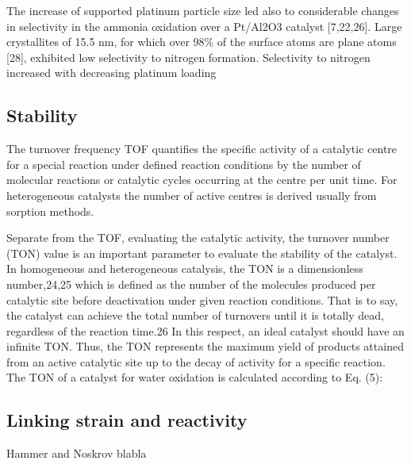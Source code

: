 The increase of supported platinum particle size led also
to considerable changes in selectivity in the ammonia oxidation over a Pt/Al2O3 catalyst [7,22,26]. Large crystallites of 15.5 nm, for which over 98\% of the surface atoms are plane atoms [28], exhibited low selectivity to nitrogen formation. Selectivity to nitrogen increased with decreasing platinum loading

\subsection{Stability}

The turnover frequency TOF quantifies the specific activity of a catalytic centre for a special reaction under defined reaction conditions by the number of molecular reactions or catalytic cycles occurring at the centre per unit time. For heterogeneous catalysts the number of active centres is derived usually from sorption methods.

Separate from the TOF, evaluating the catalytic activity, the turnover number (TON) value is an important parameter to evaluate the stability of the catalyst. In homogeneous and heterogeneous catalysis, the TON is a dimensionless number,24,25 which is defined as the number of the molecules produced per catalytic site before deactivation under given reaction conditions. That is to say, the catalyst can achieve the total number of turnovers until it is totally dead, regardless of the reaction time.26 In this respect, an ideal catalyst should have an infinite TON. Thus, the TON represents the maximum yield of products attained from an active catalytic site up to the decay of activity for a specific reaction. The TON of a catalyst for water oxidation is calculated according to Eq. (5):


\subsection{Linking strain and reactivity}

Hammer and Noskrov blabla
